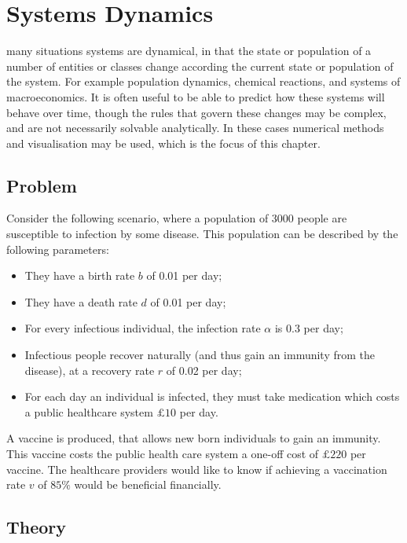 \chapter[Systems dynamics]{Systems Dynamics}\label{chp:system_dynamics}

 many situations systems are dynamical, in that the state
or population of a number of entities or classes change according the current
state or population of the system. For example population dynamics, chemical
reactions, and systems of macroeconomics. It is often useful to be able to
predict how these systems will behave over time, though the rules that govern
these changes may be complex, and are not necessarily solvable analytically. In
these cases numerical methods and visualisation may be used, which is the focus
of this chapter.

\section{Problem}\label{sec:problem}
Consider the following scenario, where a population of 3000 people are
susceptible to infection by some disease. This population can be described by
the following parameters:

\begin{itemize}
  \item They have a birth rate $b$ of 0.01 per day;
  \item They have a death rate $d$ of 0.01 per day;
  \item For every infectious individual, the infection rate $\alpha$ is 0.3 per
  day;
  \item Infectious people recover naturally (and thus gain an immunity from the
  disease), at a recovery rate $r$ of 0.02 per day;
  \item For each day an individual is infected, they must take medication which
  costs a public healthcare system $\pounds 10$ per day.
\end{itemize}

A vaccine is produced, that allows new born individuals to gain an immunity.
This vaccine costs the public health care system a one-off cost of
$\pounds 220$ per vaccine. The healthcare providers would like to know if
achieving a vaccination rate $v$ of $85\%$ would be beneficial financially.

\section{Theory}\label{sec:theory}

